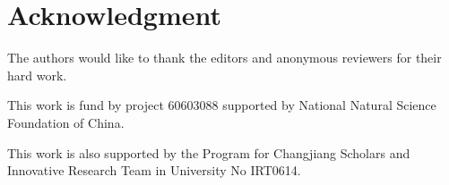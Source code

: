 \documentclass[journal]{IEEEtran}
\begin{document}



\section*{Acknowledgment}

The authors would like to thank the editors and anonymous reviewers for their hard work.

This work is fund by project 60603088 supported by National Natural Science Foundation of China.

This work is also supported by the Program for Changjiang
Scholars and Innovative Research Team in University No
IRT0614.
\ifCLASSOPTIONcaptionsoff
  \newpage
\fi





%
%
%
%
\end{document}
